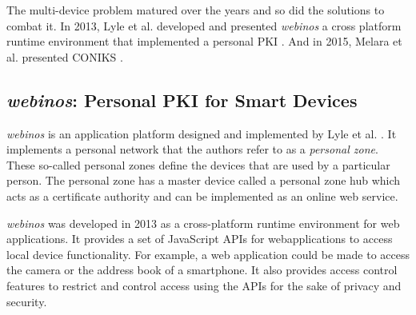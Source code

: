 The multi-device problem matured over the years and so did the solutions to combat it. In 2013, Lyle et al. developed and presented \textit{webinos} a cross platform runtime environment that implemented a personal PKI \cite{Lyle2013}. And in 2015, Melara et al. presented CONIKS  \cite{Melara2015}.



\subsection{\emph{webinos}: Personal PKI for Smart Devices}

\textit{webinos} is an application platform designed and implemented by Lyle et al. \cite{Lyle2013}. It implements a personal network that the authors refer to as a \textit{personal zone}. These so-called personal zones define the devices that are used by a particular person. The personal zone has a master device called a personal zone hub which acts as a certificate authority and can be implemented as an online web service.

\textit{webinos} was developed in 2013 as a cross-platform runtime environment for web applications. It provides a set of JavaScript APIs for webapplications to access local device functionality. For example, a web application could be made to access the camera or the address book of a smartphone. It also provides access control features to restrict and control access using the APIs for the sake of privacy and security.


